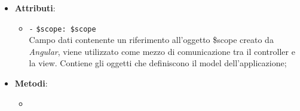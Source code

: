 \begin{itemize}
\begin{itemize}
\begin{itemize}
	\end{itemize}
	\item \textbf{Attributi}:
	\begin{itemize}
		\item \texttt{-} \texttt{\$scope: \$scope} \\
		Campo dati contenente un riferimento all’oggetto \$scope creato da \textit{Angular}, viene utilizzato come mezzo di comunicazione tra il controller e la view. Contiene gli oggetti che definiscono il model dell’applicazione;
	\end{itemize}
	\item \textbf{Metodi}:
	\begin{itemize}
		\item 
	\end{itemize}
\end{itemize}


\end{itemize}
